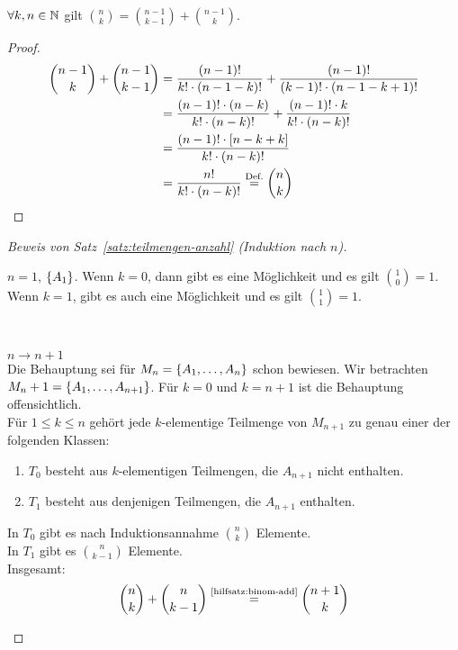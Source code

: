 \begin{hilfsatz}
    \label{hilfsatz:binom-add}
    $\forall k,n\in\naturalnumbers$ gilt $\binom{n}{k} = \binom{n-1}{k-1} + \binom{n-1}{k}$.
    \begin{proof}
        \begin{align*}
            \binom{n-1}{k} + \binom{n-1}{k-1} &= \frac{(n-1)!}{k!\cdot(n-1-k)!} + \frac{(n-1)!}{(k-1)!\cdot(n-1-k+1)!}\\
            &= \frac{(n-1)!\cdot(n-k)}{k!\cdot(n-k)!} + \frac{(n-1)!\cdot k}{k!\cdot(n-k)!}\\
            &= \frac{(n-1)!\cdot\interv{n-k+k}}{k!\cdot(n-k)!}\\
            &= \frac{n!}{k!\cdot(n-k)!} \annot{=}{Def.} \binom{n}{k}\qedhere
        \end{align*}
    \end{proof}
\end{hilfsatz}
\begin{proof}[Beweis von Satz~\ref{satz:teilmengen-anzahl} (Induktion nach $n$)]
    ~\\
    \begin{induktionsanfang}
        $n=1$, $\set{A_1}$. Wenn $k=0$, dann gibt es eine Möglichkeit und es gilt $\binom{1}{0} = 1$. Wenn $k=1$, gibt es auch eine Möglichkeit und es gilt $\binom{1}{1} = 1$.\\
    \end{induktionsanfang}
    \\
    \begin{induktionsschritt}
        $n\rightarrow n+1$\\
        Die Behauptung sei für $M_n=\set{A_1, \dots, A_n}$ schon bewiesen. Wir betrachten $M_n+1 = \set{A_1, \dots, A_{n+1}}$. Für $k=0$ und $k=n+1$ ist die Behauptung offensichtlich.\\
        Für $1\leq k \leq n$ gehört jede $k$-elementige Teilmenge von $M_{n+1}$ zu genau einer der folgenden Klassen:
        \begin{enumerate}
            \item $T_0$ besteht aus $k$-elementigen Teilmengen, die $A_{n+1}$ nicht enthalten.
            \item $T_1$ besteht aus denjenigen Teilmengen, die $A_{n+1}$ enthalten.
        \end{enumerate}
        \noindent In $T_0$ gibt es nach Induktionsannahme $\binom{n}{k}$ Elemente.\\
        In $T_1$ gibt es $\binom{n}{k-1}$ Elemente\footnotemark.\\
        Insgesamt:
        \begin{equation*}
            \binom{n}{k}+\binom{n}{k-1}\annot{=}{\ref{hilfsatz:binom-add}}\binom{n+1}{k}\qedhere
        \end{equation*}
    \end{induktionsschritt}
\end{proof}

